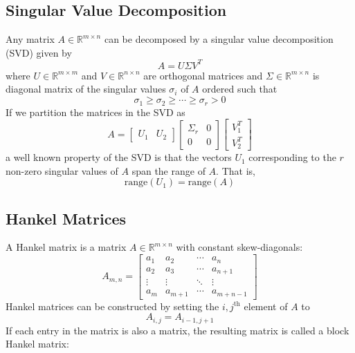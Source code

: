 \subsection{Singular Value Decomposition}
Any matrix $A \in \mathbb{R}^{m\times n}$ can be decomposed by a singular value decomposition (SVD) given by
\begin{equation*}
A = U\Sigma V^T
\end{equation*}
where $U \in \mathbb{R}^{m\times m}$ and $V \in \mathbb{R}^{n\times n}$ are orthogonal matrices and $\Sigma \in \mathbb{R}^{m\times n}$ is diagonal matrix of the singular values $\sigma_i$ of $A$ ordered such that
\begin{equation*}
\sigma_1 \geq \sigma_2 \geq \cdots \geq \sigma_r > 0
\end{equation*}
If we partition the matrices in the SVD as
\begin{equation*}
A = \left[\begin{array}{c|c}
U_1 & U_2
\end{array}\right]
\left[\begin{array}{c|c}
\Sigma_r & 0 \\ \hline 0 & 0
\end{array}\right]
\left[\begin{array}{c}
V_1^T \\ \hline V_2^T
\end{array}\right]
\end{equation*}
a well known property of the SVD is that the vectors $U_1$ corresponding to the $r$ non-zero singular values of $A$ span the range of $A$. That is,
\begin{equation*}
\mbox{range}(U_1) = \mbox{range}(A)
\end{equation*}

\subsection{Hankel Matrices}
A Hankel matrix is a matrix $A \in \mathbb{R}^{m\times n}$ with constant skew-diagonals:
\begin{equation*}
A_{m,n} = \begin{bmatrix}
a_1 & a_2 & \cdots & a_n\\
a_2 & a_3 & \cdots & a_{n+1}\\
\vdots & \vdots & \ddots & \vdots\\
a_m & a_{m+1} & \cdots & a_{m+n-1}
\end{bmatrix}
\end{equation*}
Hankel matrices can be constructed by setting the $i,j^{\mbox{th}}$ element of $A$ to
\begin{equation*}
A_{i,j} = A_{i-1, j+1}
\end{equation*}
If each entry in the matrix is also a matrix, the resulting matrix is called a block Hankel matrix:


